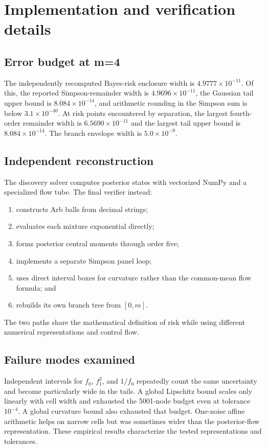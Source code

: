 \section{Implementation and verification details}
\label{app:numerics}

\subsection{Error budget at m=4}

The independently recomputed Bayes-risk enclosure width is
$4.9777\times10^{-11}$.  Of this, the reported Simpson-remainder width is
$4.9696\times10^{-11}$, the Gaussian tail upper bound is
$8.084\times10^{-14}$, and arithmetic rounding in the Simpson sum is below
$3.1\times10^{-40}$.  At risk points encountered by separation, the largest
fourth-order remainder width is $6.5690\times10^{-11}$ and the largest tail
upper bound is $8.084\times10^{-14}$.  The branch envelope width is
$5.0\times10^{-9}$.

\subsection{Independent reconstruction}

The discovery solver computes posterior states with vectorized NumPy and a
specialized flow tube.  The final verifier instead:
\begin{enumerate}
\item constructs Arb balls from decimal strings;
\item evaluates each mixture exponential directly;
\item forms posterior central moments through order five;
\item implements a separate Simpson panel loop;
\item uses direct interval boxes for curvature rather than the common-mean
flow formula; and
\item rebuilds its own branch tree from $[0,m]$.
\end{enumerate}
The two paths share the mathematical definition of risk while using different
numerical representations and control flow.

\subsection{Failure modes examined}

Independent intervals for $f_0$, $f_1^2$, and $1/f_0$ repeatedly count the
same uncertainty and become particularly wide in the tails.  A global
Lipschitz bound scales only linearly with cell width and exhausted the
5001-node budget even at tolerance $10^{-4}$.  A global curvature bound also
exhausted that budget.  One-noise affine arithmetic helps on narrow cells but
was sometimes wider than the posterior-flow representation.  These empirical
results characterize the tested representations and tolerances.
